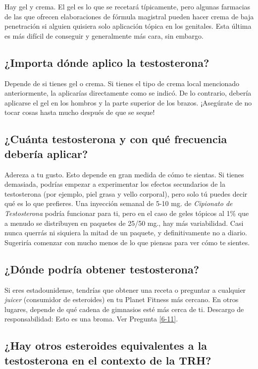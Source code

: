 \documentclass{article}
\begin{document}
Hay gel y crema. El gel es lo que se recetará típicamente, pero algunas farmacias de las que ofrecen elaboraciones de fórmula magistral pueden hacer crema de baja penetración si alguien quisiera solo aplicación tópica en los genitales. Esta última es más difícil de conseguir y generalmente más cara, sin embargo.

\subsection{¿Importa dónde aplico la testosterona?}

Depende de si tienes gel o crema. Si tienes el tipo de crema local mencionado anteriormente, la aplicarías directamente como se indicó. De lo contrario, debería aplicarse el gel en los hombros y la parte superior de los brazos. ¡Asegúrate de no tocar cosas hasta mucho después de que se seque!

\subsection{¿Cuánta testosterona y con qué frecuencia debería aplicar?}

Adereza a tu gusto. Esto depende en gran medida de cómo te sientas. Si tienes demasiada, podrías empezar a experimentar los efectos secundarios de la testosterona (por ejemplo, piel grasa y vello corporal), pero solo tú puedes decir qué es lo que prefieres. Una inyección semanal de 5-10 mg. de \textit{Cipionato de Testosterona} podría funcionar para ti, pero en el caso de geles tópicos al 1\% que a menudo se distribuyen en paquetes de 25/50 mg., hay más variabilidad. Casi nunca querrás ni siquiera la mitad de un paquete, y definitivamente no a diario. Sugeriría comenzar con mucho menos de lo que piensas para ver cómo te sientes.

\subsection{¿Dónde podría obtener testosterona?}

Si eres estadounidense, tendrías que obtener una receta o preguntar a cualquier \textit{juicer} (consumidor de esteroides) en tu Planet Fitness más cercano. En otros lugares, depende de qué cadena de gimnasios esté más cerca de ti. Descargo de responsabilidad: Esto es una broma. Ver Pregunta \ref{6-11}.

\subsection{¿Hay otros esteroides equivalentes a la testosterona en el contexto de la TRH?}
\end{document}
